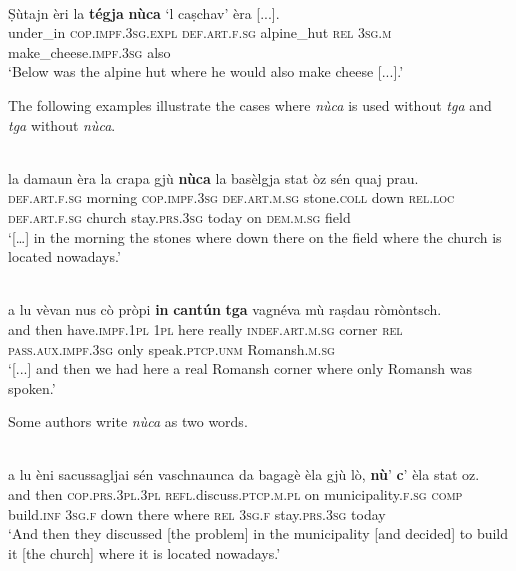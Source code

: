 \ea
\label{ex:relloc4}
\\
\gll Ṣùtajn èri la \textbf{tégja} \textbf{nùca} `l caṣchav' èra [...].\\
under\_in \textsc{cop.impf.3sg.expl} \textsc{def.art.f.sg} alpine\_hut \textsc{rel} \textsc{3sg.m} make\_cheese.\textsc{impf.3sg} also\\
\glt `Below was the alpine hut where he would also make cheese [...].'
\z

The following examples illustrate the cases where \textit{nùca} is used without \textit{tga} and \textit{tga} without \textit{nùca}.

\ea
\label{ex:relloc5}
\\
\gll    […] la damaun èra la crapa gjù \textbf{nùca} la basèlgja stat òz sén quaj prau.\\
{} \textsc{def.art.f.sg} morning \textsc{cop.impf.3sg} \textsc{def.art.m.sg} stone.\textsc{coll} down \textsc{rel.loc} \textsc{def.art.f.sg} church stay.\textsc{prs.3sg} today on \textsc{dem.m.sg} field\\
\glt `[…] in the morning the stones where down there on the field where the church is located nowadays.'
\z

\ea
\label{ex:relloc6}
\\
\gll [...] a lu vèvan nus cò pròpi \textbf{in} \textbf{cantún} \textbf{tga} vagnéva mù raṣdau ròmòntsch.\\
{} and then have.\textsc{impf.1pl} \textsc{1pl} here really \textsc{indef.art.m.sg} corner \textsc{rel} \textsc{pass.aux.impf.3sg} only speak.\textsc{ptcp.unm} Romansh.\textsc{m.sg} \\
\glt `[...] and then we had here a real Romansh corner where only Romansh was spoken.'
\z

Some authors write \textit{nùca} as two words.

\ea\label{}
\\
\gll    [...] a lu èni sacussagljai sén vaschnaunca da bagagè èla gjù lò, \textbf{nù}' \textbf{c}' èla stat oz. \\
     {} and then \textsc{cop.prs.3pl.3pl} \textsc{refl}.discuss.\textsc{ptcp.m.pl} on municipality.\textsc{f.sg} \textsc{comp} build.\textsc{inf} \textsc{3sg.f} down there where \textsc{rel} \textsc{3sg.f} stay.\textsc{prs.3sg} today\\
\glt `And then they discussed [the problem] in the municipality [and decided] to build it [the church] where it is located nowadays.'
\z

